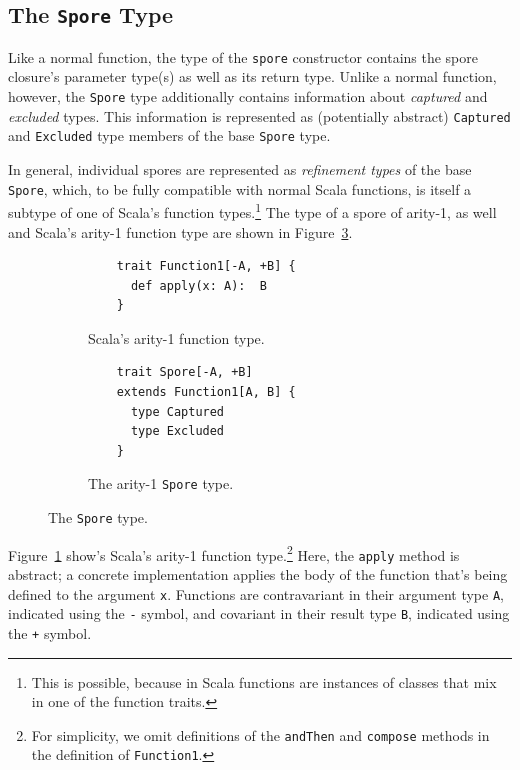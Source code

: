 \documentclass{llncs}
\begin{document}
\vspace{2mm}
\subsection{The \texttt{Spore} Type}
\label{sec:spore-type}
\vspace{1mm}

Like a normal function, the type of the \verb|spore| constructor contains the
spore closure's parameter type(s) as well as its return type. Unlike a normal function,
however, the \verb|Spore| type additionally contains information about
\textit{captured} and \textit{excluded} types. This information is represented
as (potentially abstract) \verb|Captured| and \verb|Excluded| type members of
the base \verb|Spore| type.

In general, individual spores are represented as {\em refinement types} of the
base \verb|Spore|, which, to be fully compatible with normal Scala functions,
is itself a subtype of one of Scala's function types.\footnote{This is possible, because in Scala functions are instances of classes that mix in one of the function traits.}
The type of a spore of arity-1, as well and Scala's arity-1 function type are
shown in Figure~\ref{fig:spore-type}.

\begin{figure}[b!]
\vspace{-2mm}
\begin{subfigure}{.5\textwidth}
  \centering
  \begin{lstlisting}
    trait Function1[-A, +B] {
      def apply(x: A):  B
    }
  \end{lstlisting}
  \caption{Scala's arity-1 function type.}
  \label{fig:function-arity1}
\end{subfigure}%
\begin{subfigure}{.5\textwidth}
  \centering
  \begin{lstlisting}
    trait Spore[-A, +B]
    extends Function1[A, B] {
      type Captured
      type Excluded
    }
  \end{lstlisting}
  \caption{The arity-1 \texttt{Spore} type.}
  \label{fig:spore-arity1}
\end{subfigure}%
\vspace{-1mm}
\caption{The \texttt{Spore} type.}
\label{fig:spore-type}
\vspace{-2mm}
\end{figure}

Figure~\ref{fig:function-arity1} show's Scala's arity-1 function type.\footnote{For simplicity, we omit definitions of the \verb+andThen+ and \verb+compose+ methods in the definition of \verb+Function1+.}
Here, the \verb|apply| method is abstract; a concrete implementation applies
the body of the function that's being defined to the argument \verb|x|.
Functions are contravariant in their argument type \verb|A|, indicated using
the \verb|-| symbol, and covariant in their result type \verb|B|, indicated
using the \verb|+| symbol.
\end{document}
